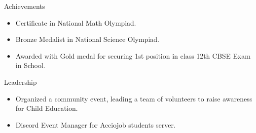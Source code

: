 \documentclass{resume} %
\begin{document}
\begin{rSection}{Achievements} 
\begin{itemize}
\item Certificate in National Math Olympiad.
\item Bronze Medalist in National Science Olympiad.
\item Awarded with Gold medal for securing 1st position in class 12th CBSE Exam in School.
\end{itemize}
\end{rSection}

\begin{rSection}{Leadership} 
\begin{itemize}
    \item Organized a community event, leading a team of volunteers to raise awareness for Child Education.
    \item Discord Event Manager for Acciojob students server.
\end{itemize}
\end{rSection}





\end{document}
